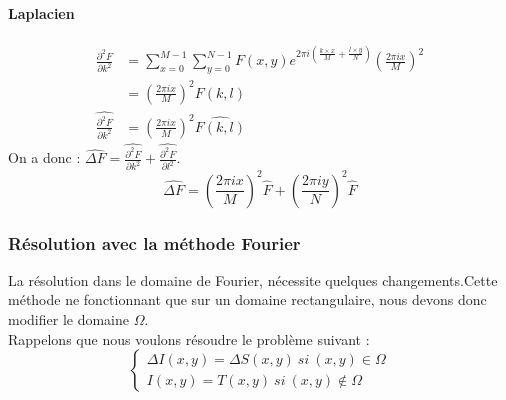 \paragraph{Laplacien}
\begin{equation}
\begin{aligned}
\frac{\partial^2 F}{\partial k ^2} & = \sum_{x = 0}^{M-1} \sum_{y = 0}^{N-1} F(x,y) e^{2\pi i\left(\frac{k\times x}{M}+\frac{l\times y}{N}\right)}\left(\frac{2\pi i x}{M}\right)^2\\
& = \left(\frac{2\pi i x}{M}\right)^2 F(k,l)\\
\widehat{\frac{\partial^2 F}{\partial k^2}} &= \left(\frac{2\pi i x}{M}\right)^2\widehat{F(k,l)}
\end{aligned}
\end{equation}
On a donc : 
$\widehat{\Delta F} = \widehat{\frac{\partial^2 F}{\partial k^2}}+ \widehat{\frac{\partial^2 F}{\partial l^2}}$.
\begin{equation}
\widehat{\Delta F} = \left(\frac{2\pi i x}{M}\right)^2 \widehat{F}+\left(\frac{2\pi i y}{N}\right)^2 \widehat{F}
\end{equation}

\subsubsection{Résolution avec la méthode Fourier}
La résolution dans le domaine de Fourier, nécessite quelques changements.Cette méthode ne fonctionnant que sur un domaine rectangulaire, nous devons donc modifier le domaine $\Omega$.\\
Rappelons que nous voulons résoudre le problème suivant :
\begin{equation}
\left\{
\begin{aligned}
\Delta I(x,y) = \Delta S(x,y) \ si \ (x,y) \in \Omega\\
I(x,y) = T(x,y) \ si \ (x,y) \notin \Omega
\end{aligned}
\right.
\end{equation}

